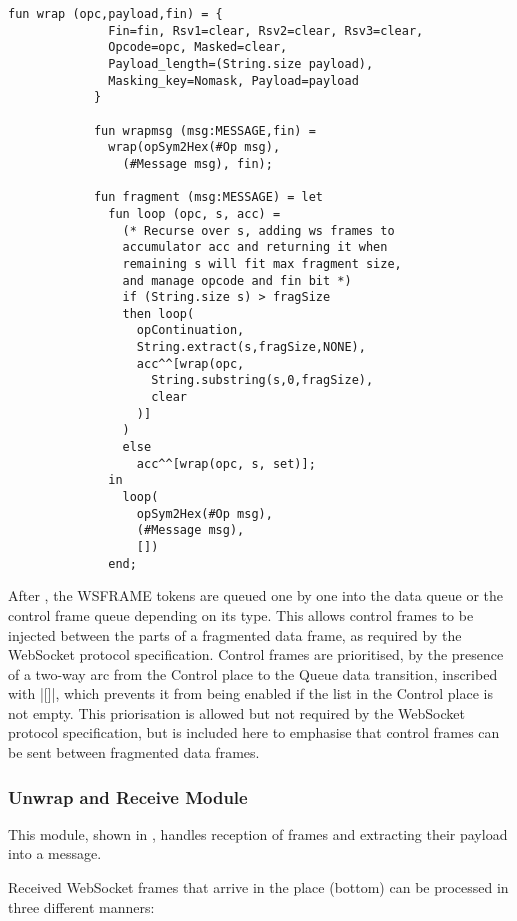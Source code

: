 			\begin{lstlisting}[label=lst:fragment,caption=wrap wrapmsg and fragment,gobble=3,float] 
			fun wrap (opc,payload,fin) = { 
			  Fin=fin, Rsv1=clear, Rsv2=clear, Rsv3=clear,
			  Opcode=opc, Masked=clear,
			  Payload_length=(String.size payload),
			  Masking_key=Nomask, Payload=payload
			}
			
			fun wrapmsg (msg:MESSAGE,fin) = 
			  wrap(opSym2Hex(#Op msg), 
			    (#Message msg), fin);
			    
			fun fragment (msg:MESSAGE) = let
			  fun loop (opc, s, acc) = 
			    (* Recurse over s, adding ws frames to 
			    accumulator acc and returning it when 
			    remaining s will fit max fragment size,
			    and manage opcode and fin bit *)
			    if (String.size s) > fragSize
			    then loop(
			      opContinuation,
			      String.extract(s,fragSize,NONE),
			      acc^^[wrap(opc, 
			        String.substring(s,0,fragSize), 
			        clear
			      )]
			    )
			    else 
			      acc^^[wrap(opc, s, set)];
			  in 
			    loop(
			      opSym2Hex(#Op msg), 
			      (#Message msg), 
			      [])
			  end;
			\end{lstlisting}
			
			After , the WSFRAME tokens are queued
			one by one into the data queue or the control frame queue depending on its
			type. This allows control frames to be injected between the parts of a
			fragmented data frame, as required by the WebSocket protocol specification.
			Control frames are prioritised, by the presence of a two-way arc from the
			Control place to the Queue data transition, inscribed with |[]|, which
			prevents it from being enabled if the list in the Control place is not
			empty. This priorisation is allowed but not required by the WebSocket
			protocol specification, but is included here to emphasise that control
			frames can be sent between fragmented data frames.
		
	\subsubsection{Unwrap and Receive Module}
		
		
		This module, shown in , handles reception of
		frames and extracting their payload into a message.
		
		Received WebSocket frames that arrive in the  place 
		(bottom) can be processed in three different manners:
		

